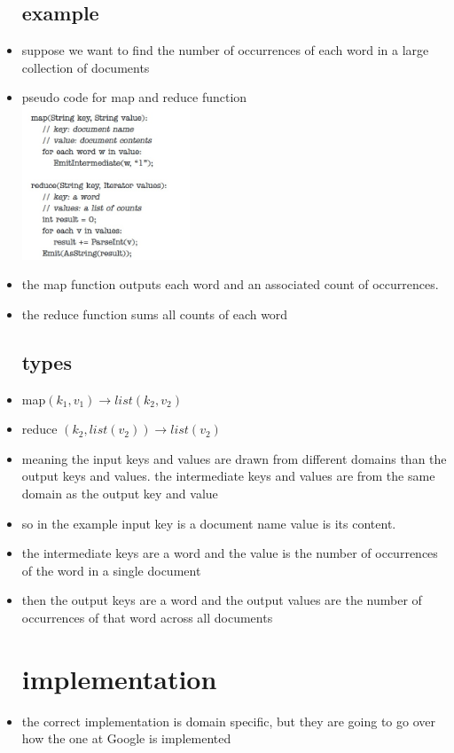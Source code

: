 \documentclass{article}
\begin{document}
\begin{itemize}
\subsection{example}
\item suppose we want to find the number of occurrences  of each word in a large collection of documents 
\item pseudo code for map and reduce function \\ \includegraphics[width=5cm]{reading assignment notes/week 2/MapReduce: Simplified Data Processing on Large Clusters/images/mw_1.jpg} 
\item the map function outputs each word and an associated count of occurrences. 
\item the reduce function sums all counts of each word
\subsection{types}
\item map$(k_1, v_1)\rightarrow list(k_2,v_2)$
\item reduce $(k_2, list(v_2))\rightarrow list(v_2)$
\item meaning the input keys and values are drawn from different domains than the output keys and values. the intermediate keys and values are from the same domain as the output key and value 
\item so in the example input key is a document name value is its content. 
\item the intermediate keys are a word and the value is the number of occurrences of the word in a single document 
\item then the output keys are a word and the output values are the number of occurrences of that word across all documents 
\section{implementation}
\item the correct implementation is domain specific, but they are going to go over how the one at Google is implemented 

\end{itemize}
\end{document}
